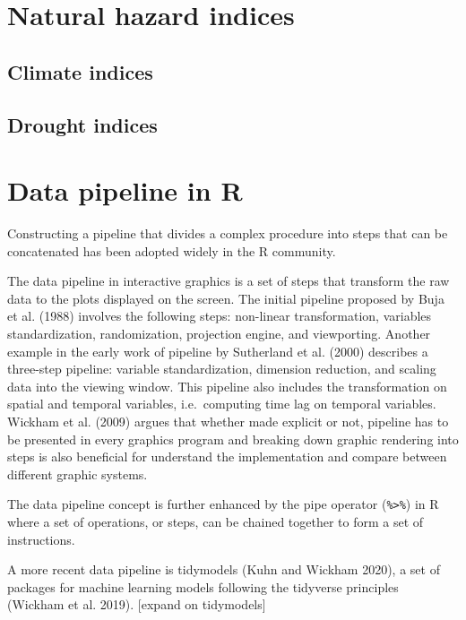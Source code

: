 \documentclass[
]{article}
\begin{document}
\hypertarget{natural-hazard-indices}{%
\section{Natural hazard indices}\label{natural-hazard-indices}}

\hypertarget{climate-indices}{%
\subsection{Climate indices}\label{climate-indices}}

\hypertarget{drought-indices}{%
\subsection{Drought indices}\label{drought-indices}}

\hypertarget{data-pipeline-in-r}{%
\section{Data pipeline in R}\label{data-pipeline-in-r}}

Constructing a pipeline that divides a complex procedure into steps that
can be concatenated has been adopted widely in the R community.

The data pipeline in interactive graphics is a set of steps that
transform the raw data to the plots displayed on the screen. The initial
pipeline proposed by Buja et al. (1988) involves the following steps:
non-linear transformation, variables standardization, randomization,
projection engine, and viewporting. Another example in the early work of
pipeline by Sutherland et al. (2000) describes a three-step pipeline:
variable standardization, dimension reduction, and scaling data into the
viewing window. This pipeline also includes the transformation on
spatial and temporal variables, i.e.~computing time lag on temporal
variables. Wickham et al. (2009) argues that whether made explicit or
not, pipeline has to be presented in every graphics program and breaking
down graphic rendering into steps is also beneficial for understand the
implementation and compare between different graphic systems.

The data pipeline concept is further enhanced by the pipe operator
(\texttt{\%\textgreater{}\%}) in R where a set of operations, or steps,
can be chained together to form a set of instructions.

A more recent data pipeline is tidymodels (Kuhn and Wickham 2020), a set
of packages for machine learning models following the tidyverse
principles (Wickham et al. 2019). {[}expand on tidymodels{]}
\end{document}

